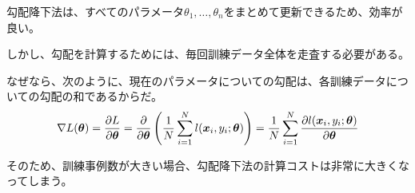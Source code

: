 \documentclass[../../../topic_machine-learning]{subfiles}
\begin{document}
勾配降下法は、すべてのパラメータ$\theta_1, \ldots, \theta_n$をまとめて更新できるため、効率が良い。

\br

しかし、勾配を計算するためには、毎回訓練データ全体を走査する必要がある。

なぜなら、次のように、現在のパラメータについての勾配は、各訓練データについての勾配の和であるからだ。
\begin{equation*}
  \nabla L(\vb*{\theta}) = \frac{\partial L}{\partial \vb*{\theta}} = \frac{\partial}{\partial \vb*{\theta}} \left( \frac{1}{N} \sum_{i=1}^{N} l(\vb*{x}_i, y_i; \vb*{\theta}) \right) = \frac{1}{N} \sum_{i=1}^{N} \frac{\partial l(\vb*{x}_i, y_i; \vb*{\theta})}{\partial \vb*{\theta}}
\end{equation*}

\br

そのため、訓練事例数が大きい場合、勾配降下法の計算コストは非常に大きくなってしまう。
\end{document}
